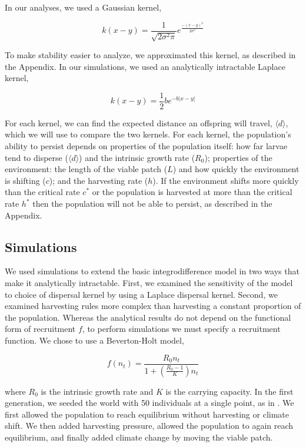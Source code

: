 \documentclass[]{article}
\begin{document}
In our analyses, we used a Gaussian kernel,

\[k(x-y)=\frac{1}{\sqrt{2\sigma^2\pi}}e^{\frac{-(x-y)^2}{2\sigma^2}}\]

\noindent To make stability easier to analyze, we approximated this kernel, as described in the Appendix. In our 
simulations, we used an analytically intractable Laplace kernel,

\[k(x-y)=\frac{1}{2}be^{-b\vert x-y\vert}\]

\noindent For each kernel, we can find the expected distance an offspring will travel, $\langle d \rangle$, which we will use to compare the two kernels.  For each kernel, the population's ability to persist depends on properties of the population itself: how far larvae 
tend to disperse ($\langle d \rangle$) and the intrinsic growth rate ($R_0$); properties of the environment: the 
length of the viable patch ($L$) and how quickly the environment is shifting ($c$); and the harvesting rate ($h
$). If the environment shifts more quickly than the critical rate $c^*$ or the population is harvested at more than 
the critical rate $h^*$ then the population will not be able to persist, as described in the Appendix. 

\subsection{Simulations }

We used simulations to extend the basic integrodifference model in two ways that make it analytically 
intractable. First, we examined the sensitivity of the model to choice of dispersal kernel by using a Laplace 
dispersal kernel. Second, we examined harvesting rules more complex than harvesting a constant proportion of the population. Whereas the 
analytical results do not depend on the functional form of recruitment $f$, to perform simulations we must 
specify a recruitment function. We chose to use a Beverton-Holt model,

\[f(n_t)=\frac{R_0n_t}{1+\left(\frac{R_0-1}{K}\right)n_t}\]

\noindent where $R_0$ is the intrinsic growth rate and $K$ is the carrying capacity.  In the first generation, we seeded the world with 50 individuals at a single point, as in 
\citep{ZhouKot2011}. We first allowed the population to reach equilibrium without harvesting or climate shift.  We then 
added harvesting pressure, allowed the population to again reach equilibrium, and finally added climate 
change by moving the viable patch.
\end{document}
